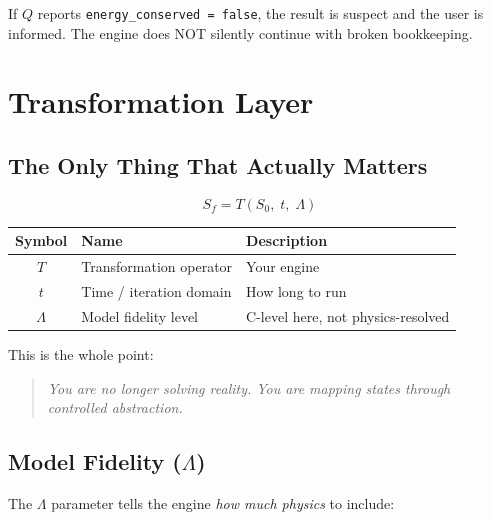 \documentclass[11pt]{article}
\begin{document}
If $Q$ reports \texttt{energy\_conserved = false}, the result is suspect and the user is informed. The engine does NOT silently continue with broken bookkeeping.

\section{Transformation Layer}

\subsection{The Only Thing That Actually Matters}

\begin{equation}
\boxed{S_f = T(S_0, \; t, \; \Lambda)}
\end{equation}

\begin{center}
\begin{tabular}{clp{8cm}}
\toprule
\textbf{Symbol} & \textbf{Name} & \textbf{Description} \\
\midrule
$T$ & Transformation operator & Your engine \\
$t$ & Time / iteration domain & How long to run \\
$\Lambda$ & Model fidelity level & C-level here, not physics-resolved \\
\bottomrule
\end{tabular}
\end{center}

This is the whole point:

\begin{quote}
\textit{You are no longer solving reality. You are mapping states through controlled abstraction.}
\end{quote}

\subsection{Model Fidelity ($\Lambda$)}

The $\Lambda$ parameter tells the engine \textit{how much physics} to include:
\end{document}
